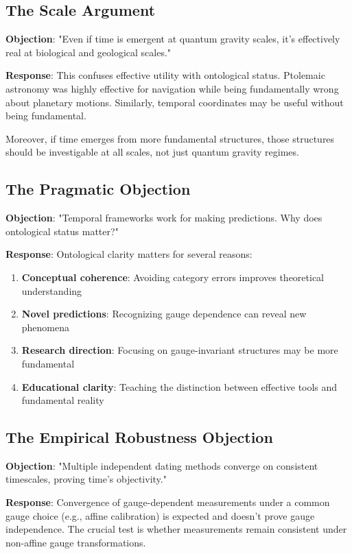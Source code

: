 \documentclass[11pt]{article}
\theoremstyle{definition}
\theoremstyle{plain}
\theoremstyle{remark}
\begin{document}
\subsection{The Scale Argument}

\textbf{Objection}: "Even if time is emergent at quantum gravity scales, it's effectively real at biological and geological scales."

\textbf{Response}: This confuses effective utility with ontological status. Ptolemaic astronomy was highly effective for navigation while being fundamentally wrong about planetary motions. Similarly, temporal coordinates may be useful without being fundamental.

Moreover, if time emerges from more fundamental structures, those structures should be investigable at all scales, not just quantum gravity regimes.

\subsection{The Pragmatic Objection}

\textbf{Objection}: "Temporal frameworks work for making predictions. Why does ontological status matter?"

\textbf{Response}: Ontological clarity matters for several reasons:
\begin{enumerate}
\item \textbf{Conceptual coherence}: Avoiding category errors improves theoretical understanding
\item \textbf{Novel predictions}: Recognizing gauge dependence can reveal new phenomena
\item \textbf{Research direction}: Focusing on gauge-invariant structures may be more fundamental
\item \textbf{Educational clarity}: Teaching the distinction between effective tools and fundamental reality
\end{enumerate}

\subsection{The Empirical Robustness Objection}

\textbf{Objection}: "Multiple independent dating methods converge on consistent timescales, proving time's objectivity."

\textbf{Response}: Convergence of gauge-dependent measurements under a common gauge choice (e.g., affine calibration) is expected and doesn't prove gauge independence. The crucial test is whether measurements remain consistent under non-affine gauge transformations.
\end{document}
